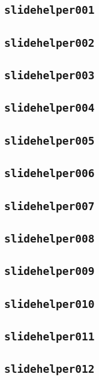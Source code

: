 \newpage
\subsection{\texttt{slidehelper001}}
\newpage
\subsection{\texttt{slidehelper002}}
\newpage
\subsection{\texttt{slidehelper003}}
\newpage
\subsection{\texttt{slidehelper004}}
\newpage
\subsection{\texttt{slidehelper005}}
\newpage
\subsection{\texttt{slidehelper006}}
\newpage
\subsection{\texttt{slidehelper007}}
\newpage
\subsection{\texttt{slidehelper008}}
\newpage
\subsection{\texttt{slidehelper009}}
\newpage
\subsection{\texttt{slidehelper010}}
\newpage
\subsection{\texttt{slidehelper011}}
\newpage
\subsection{\texttt{slidehelper012}}
\newpage
